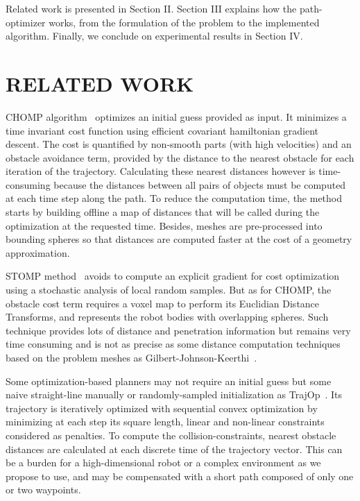 \documentclass{tADR2e}
\begin{document}
Related work is presented in Section II. Section III explains how the 
path-optimizer works, from the formulation of the problem to the implemented
algorithm. Finally, we conclude on experimental results in Section IV.




\section{RELATED WORK}

CHOMP algorithm~\cite{RatliffChomp} optimizes an initial guess provided as
input. It minimizes a time invariant cost function using efficient covariant
hamiltonian gradient descent. The cost is quantified by non-smooth parts (with
high velocities) and an obstacle avoidance term, provided by the distance to the 
nearest obstacle for each iteration of the trajectory. Calculating these nearest 
distances however is time-consuming because the distances between all pairs of 
objects must be computed at each time step along the path. To reduce the 
computation time, the method starts by building offline a map of distances that 
will be called during the optimization at the requested time. Besides, meshes 
are pre-processed into bounding spheres so that distances are computed faster 
at the cost of a geometry approximation.

STOMP method~\cite{KalakrishnanStomp} avoids to compute an 
explicit gradient for cost optimization using a stochastic analysis of local 
random samples. But as for CHOMP, the obstacle cost term requires a voxel map to 
perform its Euclidian Distance Transforms, and represents the robot bodies with 
overlapping spheres. Such technique provides lots of distance and penetration 
information but remains very time consuming and is not as precise as some 
distance computation techniques based on the problem meshes as 
Gilbert-Johnson-Keerthi~\cite{gilbertGjk}.

Some optimization-based planners may not require an initial guess but some naive 
straight-line manually or randomly-sampled initialization as 
TrajOp~\cite{SchulmanConvexOptim}. Its trajectory is iteratively optimized with 
sequential convex optimization by minimizing at each step its square length, 
linear and non-linear constraints considered as penalties. To compute the 
collision-constraints, nearest obstacle distances are calculated at each discrete 
time of the trajectory vector. This can be a burden for a high-dimensional robot 
or a complex environment as we propose to use, and may be compensated with a 
short path composed of only one or two waypoints.
\end{document}
